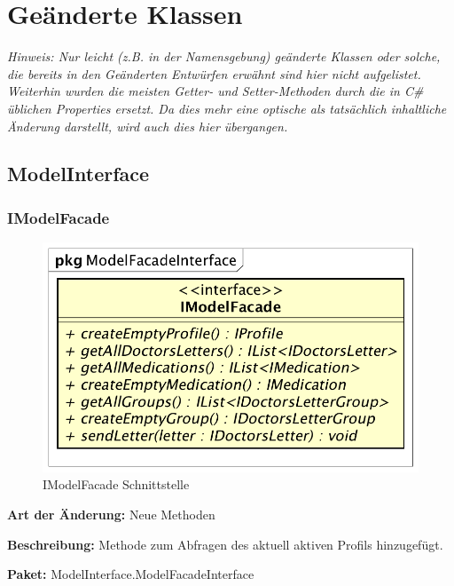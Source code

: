 \documentclass[a4paper]{scrreprt}
\begin{document}
\section{Geänderte Klassen}
\textit{Hinweis: Nur leicht (z.B. in der Namensgebung) geänderte Klassen oder solche, die bereits in den Geänderten Entwürfen erwähnt sind hier nicht aufgelistet. Weiterhin wurden die meisten Getter- und Setter-Methoden durch die in C\# üblichen Properties ersetzt. Da dies mehr eine optische als tatsächlich inhaltliche Änderung darstellt, wird auch dies hier übergangen.}

\subsection{ModelInterface}
\subsubsection{IModelFacade}
\begin{figure}[H]
\centering
\includegraphics[width=0.45\textheight]{graphics/Klassendiagramme/Model/ModelFacadeInterface.png}
\caption{IModelFacade Schnittstelle}
\end{figure}
\textbf{Art der Änderung:} Neue Methoden

\textbf{Beschreibung:} Methode zum Abfragen des aktuell aktiven Profils hinzugefügt.

\textbf{Paket:} ModelInterface.ModelFacadeInterface
\end{document}
